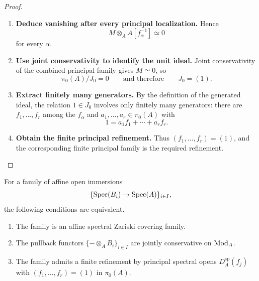 \begin{proof}
\begin{enumerate}[label=\textup{(\arabic*)}]
    \item \textbf{Deduce vanishing after every principal localization.}
    Hence
    \[
        M\otimes_AA[f_\alpha^{-1}]\simeq0
    \]
    for every \(\alpha\).

    \item \textbf{Use joint conservativity to identify the unit ideal.}
    Joint conservativity of the combined principal
    family gives \(M\simeq0\), so
    \[
        \pi_0(A)/J_0=0
        \qquad\text{and therefore}\qquad
        J_0=(1).
    \]

    \item \textbf{Extract finitely many generators.}
    By the definition of the generated ideal, the relation \(1\in J_0\)
    involves only finitely many generators: there are
    \(f_1,\ldots,f_r\) among the \(f_\alpha\) and
    \(a_1,\ldots,a_r\in\pi_0(A)\) with
    \[
        1=a_1f_1+\cdots+a_rf_r.
    \]

    \item \textbf{Obtain the finite principal refinement.}
    Thus \((f_1,\ldots,f_r)=(1)\), and the corresponding finite principal
    family is the required refinement.
\end{enumerate}
\end{proof}

\begin{proposition}
\label{prop:zariski-cover-joint-conservativity}
For a family of affine open immersions
\[
    \{\operatorname{Spec}(B_i)\to\operatorname{Spec}(A)\}_{i\in I},
\]
the following conditions are equivalent.
\begin{enumerate}[label=(\roman*)]
    \item The family is an affine spectral Zariski covering family.
    \item The pullback functors \(\{-\otimes_AB_i\}_{i\in I}\) are jointly
    conservative on \(\operatorname{Mod}_A\).
    \item The family admits a finite refinement by principal spectral opens
    \(D_A^{\mathrm{sp}}(f_j)\) with \((f_1,\ldots,f_r)=(1)\) in
    \(\pi_0(A)\).
\end{enumerate}
\end{proposition}

